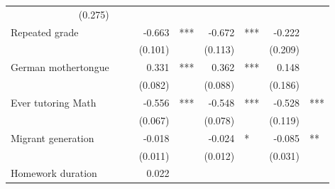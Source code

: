 \documentclass{article}
\begin{document}
\begin{table}[!h]
\begin{tabular}{lllllllll}
  \multicolumn{1}{r}{(0.275)} &
  \multicolumn{1}{l}{} \\
\multicolumn{1}{l}{Repeated grade} &
  \multicolumn{1}{r}{} &
  \multicolumn{1}{l}{} &
  \multicolumn{1}{r}{-0.663} &
  \multicolumn{1}{l}{***} &
  \multicolumn{1}{r}{-0.672} &
  \multicolumn{1}{l}{***} &
  \multicolumn{1}{r}{-0.222} &
  \multicolumn{1}{l}{} \\
\multicolumn{1}{l}{} &
  \multicolumn{1}{r}{} &
  \multicolumn{1}{l}{} &
  \multicolumn{1}{r}{(0.101)} &
  \multicolumn{1}{l}{} &
  \multicolumn{1}{r}{(0.113)} &
  \multicolumn{1}{l}{} &
  \multicolumn{1}{r}{(0.209)} &
  \multicolumn{1}{l}{} \\
\multicolumn{1}{l}{German mothertongue} &
  \multicolumn{1}{r}{} &
  \multicolumn{1}{l}{} &
  \multicolumn{1}{r}{0.331} &
  \multicolumn{1}{l}{***} &
  \multicolumn{1}{r}{0.362} &
  \multicolumn{1}{l}{***} &
  \multicolumn{1}{r}{0.148} &
  \multicolumn{1}{l}{} \\
\multicolumn{1}{l}{} &
  \multicolumn{1}{r}{} &
  \multicolumn{1}{l}{} &
  \multicolumn{1}{r}{(0.082)} &
  \multicolumn{1}{l}{} &
  \multicolumn{1}{r}{(0.088)} &
  \multicolumn{1}{l}{} &
  \multicolumn{1}{r}{(0.186)} &
  \multicolumn{1}{l}{} \\
\multicolumn{1}{l}{Ever tutoring Math} &
  \multicolumn{1}{r}{} &
  \multicolumn{1}{l}{} &
  \multicolumn{1}{r}{-0.556} &
  \multicolumn{1}{l}{***} &
  \multicolumn{1}{r}{-0.548} &
  \multicolumn{1}{l}{***} &
  \multicolumn{1}{r}{-0.528} &
  \multicolumn{1}{l}{***} \\
\multicolumn{1}{l}{} &
  \multicolumn{1}{r}{} &
  \multicolumn{1}{l}{} &
  \multicolumn{1}{r}{(0.067)} &
  \multicolumn{1}{l}{} &
  \multicolumn{1}{r}{(0.078)} &
  \multicolumn{1}{l}{} &
  \multicolumn{1}{r}{(0.119)} &
  \multicolumn{1}{l}{} \\
\multicolumn{1}{l}{Migrant generation} &
  \multicolumn{1}{r}{} &
  \multicolumn{1}{l}{} &
  \multicolumn{1}{r}{-0.018} &
  \multicolumn{1}{l}{} &
  \multicolumn{1}{r}{-0.024} &
  \multicolumn{1}{l}{*} &
  \multicolumn{1}{r}{-0.085} &
  \multicolumn{1}{l}{**} \\
\multicolumn{1}{l}{} &
  \multicolumn{1}{r}{} &
  \multicolumn{1}{l}{} &
  \multicolumn{1}{r}{(0.011)} &
  \multicolumn{1}{l}{} &
  \multicolumn{1}{r}{(0.012)} &
  \multicolumn{1}{l}{} &
  \multicolumn{1}{r}{(0.031)} &
  \multicolumn{1}{l}{} \\
\multicolumn{1}{l}{Homework duration} &
  \multicolumn{1}{r}{} &
  \multicolumn{1}{l}{} &
  \multicolumn{1}{r}{0.022} &
  \multicolumn{1}{l}{} &

\end{tabular}
\end{table}
\end{document}
